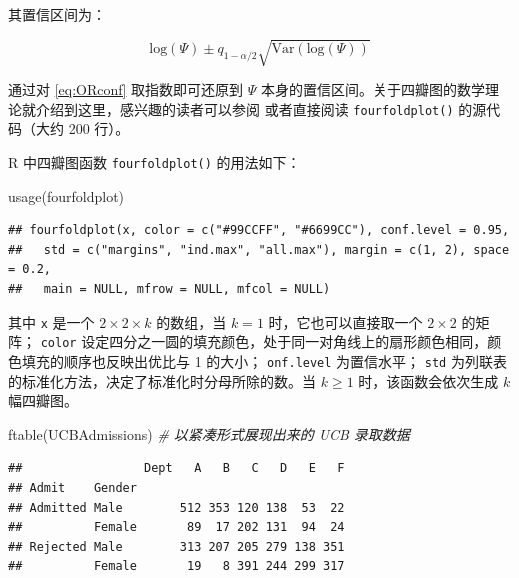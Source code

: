 \documentclass[
  b5paper,
  UTF8,twoside]{book}
\newenvironment{Shaded}{\begin{snugshade}}{\end{snugshade}}
\newcommand{\CommentTok}[1]{\textcolor[rgb]{0.56,0.35,0.01}{\textit{#1}}}
\newcommand{\FunctionTok}[1]{\textcolor[rgb]{0.00,0.00,0.00}{#1}}
\newcommand{\NormalTok}[1]{#1}
\begin{document}
其置信区间为：

\begin{equation}
\mathrm{log}(\Psi)\pm q_{1-\alpha/2}\sqrt{\mathrm{Var}(\mathrm{log}(\Psi))}
\label{eq:ORconf}
\end{equation}

通过对 \eqref{eq:ORconf} 取指数即可还原到 \(\Psi\) 本身的置信区间。关于四瓣图的数学理论就介绍到这里，感兴趣的读者可以参阅 \citet{Friendly94} 或者直接阅读 \texttt{fourfoldplot()} 的源代码（大约 200 行）。

R 中四瓣图函数 \texttt{fourfoldplot()} 的用法如下：

\begin{Shaded}
\begin{Highlighting}[]
\FunctionTok{usage}\NormalTok{(fourfoldplot)}
\end{Highlighting}
\end{Shaded}

\begin{verbatim}
## fourfoldplot(x, color = c("#99CCFF", "#6699CC"), conf.level = 0.95,
##   std = c("margins", "ind.max", "all.max"), margin = c(1, 2), space = 0.2,
##   main = NULL, mfrow = NULL, mfcol = NULL)
\end{verbatim}

其中 \texttt{x} 是一个 \(2\times2\times k\) 的数组，当 \(k=1\) 时，它也可以直接取一个 \(2\times2\) 的矩阵； \texttt{color} 设定四分之一圆的填充颜色，处于同一对角线上的扇形颜色相同，颜色填充的顺序也反映出优比与 1 的大小； \texttt{onf.level} 为置信水平； \texttt{std} 为列联表的标准化方法，决定了标准化时分母所除的数。当 \(k\geq1\) 时，该函数会依次生成 \(k\) 幅四瓣图。





\begin{Shaded}
\begin{Highlighting}[]
\FunctionTok{ftable}\NormalTok{(UCBAdmissions) }\CommentTok{\# 以紧凑形式展现出来的 UCB 录取数据}
\end{Highlighting}
\end{Shaded}

\begin{verbatim}
##                 Dept   A   B   C   D   E   F
## Admit    Gender                             
## Admitted Male        512 353 120 138  53  22
##          Female       89  17 202 131  94  24
## Rejected Male        313 207 205 279 138 351
##          Female       19   8 391 244 299 317
\end{verbatim}
\end{document}
